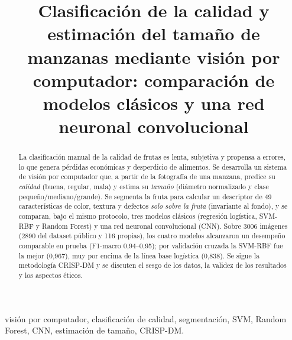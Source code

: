 \documentclass[conference]{IEEEtran}
\begin{document}
\title{Clasificación de la calidad y estimación del tamaño de manzanas mediante
visión por computador: comparación de modelos clásicos y una red neuronal
convolucional}

\author{
\and
{}
\and
{}
}
\maketitle

\begin{abstract}
La clasificación manual de la calidad de frutas es lenta, subjetiva y propensa a
errores, lo que genera pérdidas económicas y desperdicio de alimentos. Se
desarrolla un sistema de visión por computador que, a partir de la fotografía de
una manzana, predice su \emph{calidad} (buena, regular, mala) y estima su
\emph{tamaño} (diámetro normalizado y clase pequeño/mediano/grande). Se segmenta
la fruta para calcular un descriptor de 49 características de color, textura y
defectos \emph{solo sobre la fruta} (invariante al fondo), y se comparan, bajo el
mismo protocolo, tres modelos clásicos (regresión logística, SVM-RBF y Random
Forest) y una red neuronal convolucional (CNN). Sobre 3006 imágenes (2890 del
dataset público y 116 propias), los cuatro modelos alcanzaron un desempeño
comparable en prueba (F1-macro 0{,}94--0{,}95); por validación cruzada la SVM-RBF
fue la mejor (0{,}967), muy por encima de la línea base logística (0{,}838). Se sigue
la metodología CRISP-DM y se discuten el sesgo de los datos, la validez de los
resultados y los aspectos éticos.
\end{abstract}
\begin{IEEEkeywords}
visión por computador, clasificación de calidad, segmentación, SVM, Random
Forest, CNN, estimación de tamaño, CRISP-DM.
\end{IEEEkeywords}
\end{document}
